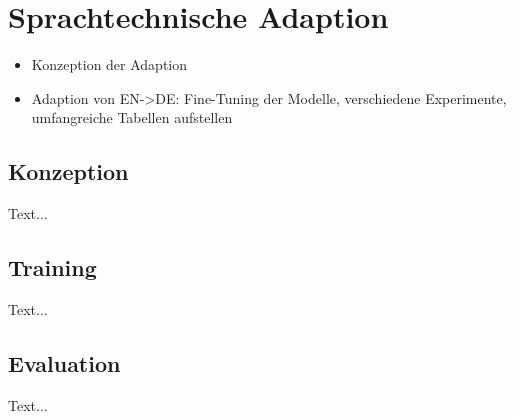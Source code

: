 \chapter{Sprachtechnische Adaption}
\thispagestyle{fancy}
\label{chap:Sprachtechnische Adaption}

\begin{itemize}
	\item Konzeption der Adaption
	\item Adaption von EN->DE: Fine-Tuning der Modelle, verschiedene Experimente, umfangreiche Tabellen aufstellen
\end{itemize}


\section{Konzeption}
Text...


\section{Training}
Text...


\section{Evaluation}
Text...
